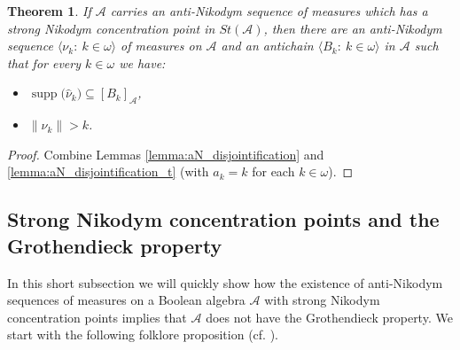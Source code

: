 \documentclass[a4paper,11pt,fleqn]{amsart}
\newtheorem{theorem}{Theorem}[section]
\theoremstyle{definition}
\theoremstyle{remark}
\newtheorem{remark}[theorem]{Remark}
\numberwithin{equation}{section}
\newcommand{\N}{\mathbb{N}}
\newcommand{\aA}{\mathcal{A}}
\newcommand{\sub}{\subseteq}
\DeclareMathOperator{\supp}{supp}
\newcommand{\wh}{\widehat}
\newcommand{\seqn}[1]{\big\langle#1\colon\ n\io\big\rangle}
\newcommand{\seqk}[1]{\big\langle#1\colon\ k\io\big\rangle}
\newcommand{\clopen}[1]{\left[#1\right]}
\newcommand{\io}{\in\omega}%
\begin{document}
\begin{theorem}\label{thm:sNcp_disj_supp}
If $\aA$ carries an anti-Nikodym sequence of measures which has a strong Nikodym concentration point in $St(\aA)$, then there are an anti-Nikodym sequence $\seqk{\nu_k}$ of measures on $\aA$ and an antichain $\seqk{B_k}$ in $\aA$ such that for every $k\io$ we have:
\begin{itemize}
    \item $\supp\big(\wh{\nu}_k\big)\sub\clopen{B_k}_\aA$,
    \item $\big\|\nu_k\big\|>k$.
\end{itemize}
\end{theorem}
\begin{proof}
     Combine Lemmas \ref{lemma:aN_disjointification} and \ref{lemma:aN_disjointification_t} (with $a_k=k$ for each $k\io$).
\end{proof}


\subsection{Strong Nikodym concentration points and the Grothendieck property\label{sec:no_gr}}

In this short subsection we will quickly show how the existence of anti-Nikodym sequences of measures on a Boolean algebra $\aA$ with strong Nikodym concentration points implies that $\aA$ does not have the Grothendieck property. We start with the following folklore proposition (cf. \cite[Theorem 19.3.5]{KKLPS}).
\end{document}

